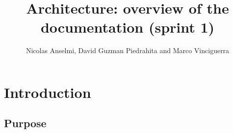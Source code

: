 \documentclass{article}
\title{Architecture: overview of the documentation (sprint 1)}
\author{Nicolas Anselmi, David Guzman Piedrahita and Marco Vinciguerra}
\begin{document}
\maketitle

\section{Introduction}

\subsection{Purpose} 
\end{document}
